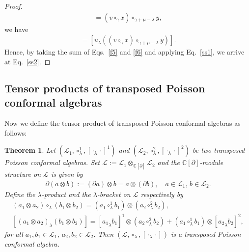 \documentclass[11pt,letterpaper,reqno]{amsart}
\newtheorem{theorem}{Theorem}[section]
\theoremstyle{definition}
\numberwithin{equation}{section}
\begin{document}
\begin{proof}
\begin{align*}
      =(v\circ_{\gamma}x)\circ_{\gamma+\mu-\lambda}y,
   \end{align*}
we have %
   \begin{align*}
        [u_{\lambda}(x\circ_{\mu-\lambda}(v\circ_{\gamma}y))]=[u_{\lambda}((v\circ_{\gamma}x)\circ_{\gamma+\mu-\lambda}y)].
   \end{align*}
Hence, by taking the sum of Eqs.~\eqref{f5} and \eqref{f6} and applying Eq.~\eqref{ss1}, we arrive at Eq.~\eqref{ss2}.
\end{proof}

\subsection{Tensor products of transposed Poisson conformal algebras}
Now we define the tensor product of transposed Poisson conformal algebras as follows:
\begin{theorem}
Let $(\mathcal{L}_1 ,\circ^{1}_{\lambda},[\cdot_{\lambda}\cdot]^1)$ and $(\mathcal{L}_2 ,\circ^{2}_{\lambda},[\cdot_{\lambda}\cdot]^2)$ be two transposed Poisson conformal algebras.
Set $\mathcal L:=\mathcal L_1\otimes_{\mathbb C[\partial]} \mathcal L_2$ and the $\mathbb C[\partial]$-module structure on $\mathcal L$ is given by
\begin{align*}
\partial(a\otimes b):=(\partial a)\otimes b = a\otimes (\partial b),
\quad a\in\mathcal L_1,\, b\in\mathcal L_2 .
\end{align*}
Define the $\lambda$-product and the $\lambda$-bracket on $\mathcal L$ respectively by
\begin{gather*}
(a_1\otimes a_2)\circ_\lambda (b_1\otimes b_2)
= (a_1\circ^{1}_\lambda b_1)\otimes (a_2\circ^{2}_\lambda b_2),\\
[(a_1\otimes a_2)_\lambda (b_1\otimes b_2)]
= [{a_1}_{\lambda}b_1]^{1}\otimes (a_2\circ^{2}_\lambda b_2)+(a_1\circ^{1}_\lambda b_1)\otimes [{a_2}_{\lambda}b_2]^{2},
\end{gather*}
for all $a_1,b_1 \in \mathcal{L}_1$, $a_2,b_2 \in \mathcal{L}_2$.
Then $(\mathcal L,\circ_\lambda,[\cdot_\lambda\cdot])$ is a transposed Poisson conformal algebra.
\end{theorem}
\end{document}
